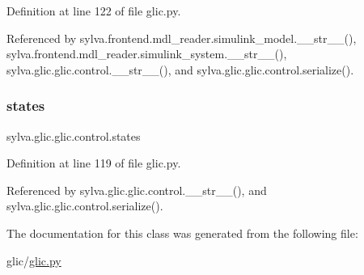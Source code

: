 Definition at line 122 of file glic.\+py.



Referenced by sylva.\+frontend.\+mdl\+\_\+reader.\+simulink\+\_\+model.\+\_\+\+\_\+str\+\_\+\+\_\+(), sylva.\+frontend.\+mdl\+\_\+reader.\+simulink\+\_\+system.\+\_\+\+\_\+str\+\_\+\+\_\+(), sylva.\+glic.\+glic.\+control.\+\_\+\+\_\+str\+\_\+\+\_\+(), and sylva.\+glic.\+glic.\+control.\+serialize().

\mbox{\label{classsylva_1_1glic_1_1glic_1_1control_a392a1e20052ef15fa96049f9b201be02}} 
\subsubsection{\texorpdfstring{states}{states}}
{\footnotesize\ttfamily sylva.\+glic.\+glic.\+control.\+states}



Definition at line 119 of file glic.\+py.



Referenced by sylva.\+glic.\+glic.\+control.\+\_\+\+\_\+str\+\_\+\+\_\+(), and sylva.\+glic.\+glic.\+control.\+serialize().



The documentation for this class was generated from the following file\+:\begin{DoxyCompactItemize}
\item 
glic/\hyperlink{glic_8py}{glic.\+py}\end{DoxyCompactItemize}
